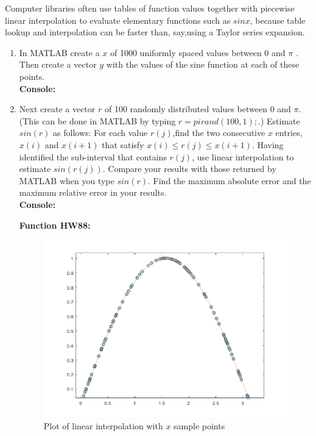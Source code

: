 \documentclass[12pt]{article}
\makeatletter
\theoremstyle{homework}
\newenvironment{exercise}[1]
{\def\@currentlabel{#1}\exercisecore}
{\endexercisecore}
\makeatother
\begin{document}
\begin{exercise}{Text 8.8} Computer libraries often use tables of function values together with piecewise linear interpolation to evaluate elementary functions such as $sin x$, 
  because table lookup and interpolation can be faster than, say,using a Taylor series expansion.\\
  \begin{enumerate}
    \item In MATLAB create a $x$ of 1000 uniformly ­spaced values between 0 and $\pi$ . 
    Then create a vector $y$ with the values of the sine function at each of these points.\\
    \textbf{Console:}
    \begin{center}
    
    \end{center}
    

    \vspace{.25in}
    \item Next create a vector $r$ of 100 randomly distributed values between 0  and $\pi$.  (This  can  be  done in  MATLAB by  typing $r  =  pirand(100,1);$.) Estimate $sin(r)$  
    as  follows: For  each value $r(j)$,find the two consecutive 
    $x$ entries, $x(i)$ and $x(i+1)$ that satisfy $x(i) \le r(j) \le x(i+1)$.  Having  identified  the  
    sub-interval that  contains $r(j)$, use linear interpolation to estimate $sin(r(j))$. Compare your results with those returned 
    by MATLAB when you type $sin(r)$. Find the maximum absolute error and the maximum relative error in your results.\\
    \textbf{Console:}
    \begin{center}
    
    \end{center}

    \textbf{Function HW88:}
    \begin{center}
    
    \end{center}

    \begin{figure}[H]
      \caption{Plot of linear interpolation with $x$ sample points}
      \includegraphics[width = .80\textwidth]{linear_interpolation.png}  
      \centering
   \end{figure}


\end{enumerate}
\end{exercise}
\end{document}

